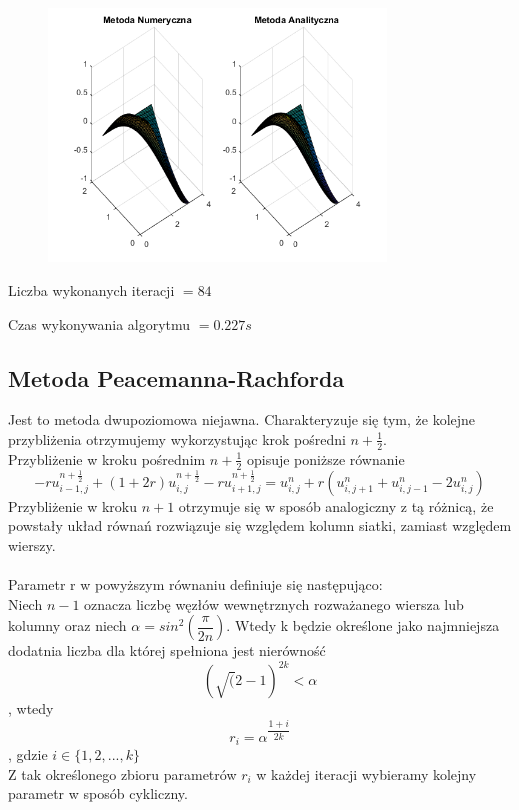 \begin{figure}[!ht]
	\begin{center}
		\includegraphics[width=0.8\textwidth]{Lab6/charts/young/zad2/55.png}
	\end{center}
\end{figure}

Liczba wykonanych iteracji $ = 84 $

Czas wykonywania algorytmu $ = 0.227 s$

\newpage
\subsection{Metoda Peacemanna-Rachforda}
Jest to metoda dwupoziomowa niejawna. Charakteryzuje się tym, że kolejne przybliżenia otrzymujemy wykorzystując krok pośredni $n+\frac{1}{2}$.
\\
Przybliżenie w kroku pośrednim $n+\frac{1}{2}$ opisuje poniższe równanie
$$-r u_{i-1,j}^{n+\frac{1}{2}} + (1+2r) u ^{n+\frac{1}{2}}_{i,j} - r u_{i+1,j}^{n+\frac{1}{2}} = u^n_{i,j} + r\left(u^n_{i,j+1} + u^n_{i,j-1} - 2u^n_{i,j} \right)$$
Przybliżenie w kroku $n+1$ otrzymuje się w sposób analogiczny z tą różnicą, że powstały układ równań rozwiązuje się względem kolumn siatki, zamiast względem wierszy.
\\\\
Parametr r w powyższym równaniu definiuje się następująco:\\
Niech $n-1$ oznacza liczbę węzłów wewnętrznych rozważanego wiersza lub kolumny oraz niech $\alpha = sin^2\left(\dfrac{\pi}{2n}\right)$. Wtedy k będzie określone jako najmniejsza dodatnia liczba dla której spełniona jest nierówność
$$\left(\sqrt(2 - 1\right)^{2k} < \alpha$$
, wtedy $$r_i = \alpha^{\dfrac{1+i}{2k}}$$, gdzie $i\in \{1,2,...,k\}$\\
Z tak określonego zbioru parametrów $r_i$ w każdej iteracji wybieramy kolejny parametr w sposób cykliczny.
\newpage
